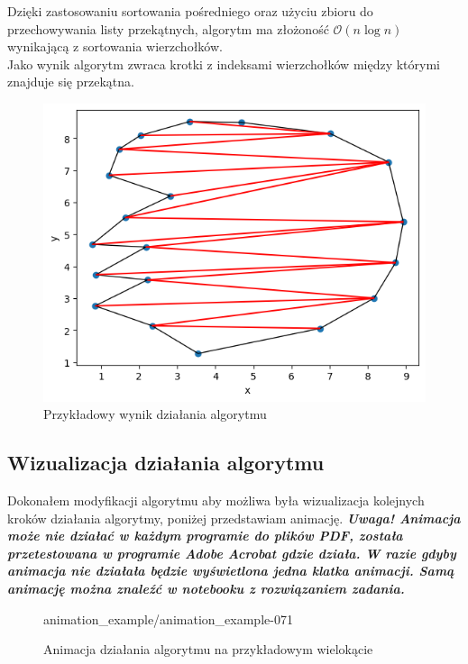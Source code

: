 \documentclass[a4paper]{article}
\begin{document}
    \noindent Dzięki zastosowaniu sortowania pośredniego oraz użyciu zbioru do przechowywania listy przekątnych,
    algorytm ma złożoność $\mathcal{O} (n \log n)$ wynikającą z sortowania wierzchołków.\\
    Jako wynik algorytm zwraca krotki z indeksami wierzchołków między którymi znajduje się przekątna.
    \begin{figure}[H]
        \centering
        \includegraphics{przykladowa_triangulacja.png}
        \caption{Przykładowy wynik działania algorytmu}
        \label{fig:example_triangulation}
    \end{figure}
    
    \pagebreak
    \subsection{Wizualizacja działania algorytmu}
    Dokonałem modyfikacji algorytmu aby możliwa była wizualizacja kolejnych kroków działania algorytmy, 
    poniżej przedstawiam animację. \textbf{\textit{Uwaga! Animacja może nie działać w każdym
    programie do plików PDF, została przetestowana w programie Adobe Acrobat gdzie działa.
    W razie gdyby animacja nie działała będzie wyświetlona jedna klatka animacji. Samą 
    animację można znaleźć w notebooku z rozwiązaniem zadania.}}
    \begin{figure}[H]
        \centering
        {animation_example/animation_example-}{0}{71}
        \caption{Animacja działania algorytmu na przykładowym wielokącie}
        \label{fig:animation_of_triangulation}
    \end{figure}
    
\end{document}
